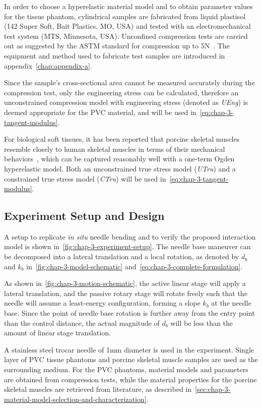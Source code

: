 In order to choose a hyperelastic material model and to obtain parameter values for the tissue phantom, cylindrical samples are fabricated from liquid plastisol (142 Super Soft, Bait Plastics, MO, USA) and tested with an electromechanical test system (MTS, Minnesota, USA). Unconfined compression tests are carried out as suggested by the ASTM standard for compression up to 5N~\parencite{StandardTestMethods}. The equipment and method used to fabricate test samples are introduced in appendix~\ref{chap:appendix-a}.

Since the sample's cross-sectional area cannot be measured accurately during the compression test, only the engineering stress can be calculated, therefore an unconstrained compression model with engineering stress (denoted as \textit{UEng}) is deemed appropriate for the PVC material, and will be used in~\cref{eq:chap-3-tangent-modulus}.

For biological soft tissues, it has been reported that porcine skeletal muscles resemble closely to human skeletal muscles in terms of their mechanical behaviors~\parencite{moVitroCompressiveProperties2020}, which can be captured reasonably well with a one-term Ogden hyperelastic model. Both an unconstrained true stress model (\textit{UTru}) and a constrained true stress model (\textit{CTru}) will be used in~\cref{eq:chap-3-tangent-modulus}.

\subsection{Experiment Setup and Design}
\label{sec:chap-3-experiment-setup-and-design-1}

A setup to replicate \textit{in situ} needle bending and to verify the proposed interaction model is shown in~\cref{fig:chap-3-experiment-setup}. The needle base maneuver can be decomposed into a lateral translation and a local rotation, as denoted by $d_b$ and $k_b$ in~\cref{fig:chap-3-model-schematic} and~\cref{eq:chap-3-complete-formulation}.

As shown in~\cref{fig:chap-3-motion-schematic}, the active linear stage will apply a lateral translation, and the passive rotary stage will rotate freely such that the needle will assume a least-energy configuration, forming a slope $k_b$ at the needle base. Since the point of needle base rotation is further away from the entry point than the control distance, the actual magnitude of $d_b$ will be less than the amount of linear stage translation.

A stainless steel trocar needle of 1mm diameter is used in the experiment. Single layer of PVC tissue phantoms and porcine skeletal muscle samples are used as the surrounding medium. For the PVC phantoms, material models and parameters are obtained from compression tests, while the material properties for the porcine skeletal muscles are retrieved from literature, as described in~\cref{sec:chap-3-material-model-selection-and-characterization}.

